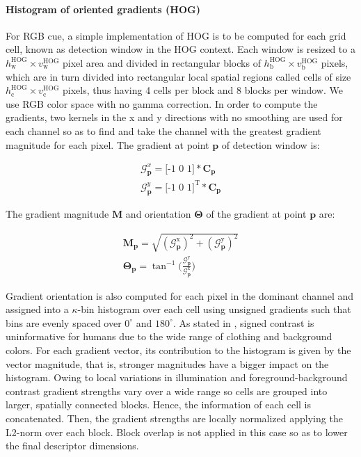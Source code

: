 \documentclass[10pt,twocolumn,letterpaper]{article}
\begin{document}
\paragraph{Histogram of oriented gradients (HOG)}
For RGB cue, a simple implementation of HOG \cite{dalal2005histograms} is to be computed for each grid cell, known as detection window in the HOG context. Each window is resized to a $h_\mathrm{w}^\mathrm{HOG} \times v_\mathrm{w}^\mathrm{HOG}$ pixel area and divided in rectangular blocks of $h_\mathrm{b}^\mathrm{HOG} \times v_\mathrm{b}^\mathrm{HOG}$ pixels, which are in turn divided into rectangular local spatial regions called cells of size $h_\mathrm{c}^\mathrm{HOG} \times v_\mathrm{c}^\mathrm{HOG}$ pixels, thus having 4 cells per block and 8 blocks per window. We use RGB color space with no gamma correction. In order to compute the gradients, two kernels in the x and y directions with no smoothing are used for each channel so as to find and take the channel with the greatest gradient magnitude for each pixel. The gradient at point $\mathbf{p}$ of detection window is:

\begin{gather}
\mathcal{G}_\mathbf{p}^x = \mbox{[-1 0 1]} \ast \mathbf{C}_\mathbf{p} \label{eq:gx} \\[2ex]
\mathcal{G}_\mathbf{p}^y = \mbox{[-1 0 1]}^\mathrm{T} \ast \mathbf{C}_\mathbf{p} \label{eq:gy}
\end{gather}

The gradient magnitude $\mathbf{M}$ and orientation $\mathbf{\Theta}$ of the gradient at point $\mathbf{p}$ are:

\begin{gather}
\mathbf{M}_{\mathbf{p}} = \sqrt{(\mathcal{G}_{\mathbf{p}}^{\mathrm{x}})^2 + (\mathcal{G}_{\mathbf{p}}^{\mathrm{y}})^2} \label{eq:magnitude}\\[2ex]
\mathbf{\Theta}_{\mathbf{p}} = \tan^{-1} \Big(\frac{\mathcal{G}_{\mathbf{p}}^{\mathrm{y}}}{\mathcal{G}_{\mathbf{p}}^{\mathrm{x}}}\Big) \label{eq:orientation}
\end{gather}

Gradient orientation is also computed for each pixel in the dominant channel and assigned into a $\kappa$-bin histogram over each cell using unsigned gradients such that bins are evenly spaced over $0^\circ$ and $180^\circ$. As stated in \cite{dalal2005histograms}, signed contrast is uninformative for humans due to the wide range of clothing and background colors. For each gradient vector, its contribution to the histogram is given by the vector magnitude, that is, stronger magnitudes have a bigger impact on the histogram. Owing to local variations in illumination and foreground-background contrast gradient strengths vary over a wide range so cells are grouped into larger, spatially connected blocks. Hence, the information of each cell is concatenated. Then, the gradient strengths are locally normalized applying the L2-norm over each block. Block overlap is not applied in this case so as to lower the final descriptor dimensions. 
\end{document}
